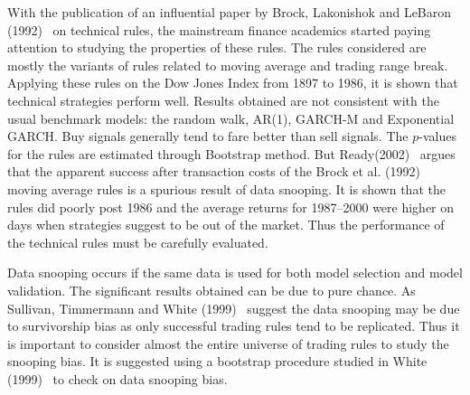With the publication of an influential paper by Brock, Lakonishok and LeBaron (1992)~\cite{BLL} on technical rules, the mainstream finance academics started paying attention to studying the properties of these rules. The rules considered are mostly the variants of rules related to moving average and trading range break. Applying these rules on the Dow Jones Index from 1897 to 1986, it is shown that technical strategies perform well. Results obtained are not consistent with the usual benchmark models: the random walk, AR(1), GARCH-M and Exponential GARCH. Buy signals generally tend to fare better than sell signals. The $p$-values for the rules are estimated through Bootstrap method. But Ready(2002)~\cite{ready} argues that the apparent success after transaction costs of the Brock et al. (1992)~\cite{BLL} moving average rules is a spurious result of data snooping. It is shown that the rules did poorly post 1986 and the average returns for 1987--2000 were higher on days when strategies suggest to be out of the market. Thus the performance of the technical rules must be carefully evaluated.


Data snooping occurs if the same data is used for both model selection and model validation. The significant results obtained can be due to pure chance. As Sullivan, Timmermann and White (1999)~\cite{sullivan1999data} suggest the data snooping may be due to survivorship bias as only successful trading rules tend to be replicated. Thus it is important to consider almost the entire universe of trading rules to study the snooping bias. It is suggested using a bootstrap procedure studied in White (1999)~\cite{white1999} to check on data snooping bias. 


